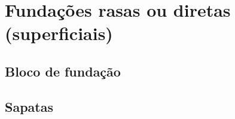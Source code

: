 \documentclass[12pt, a4paper]{article}
\begin{document}
	

	\section{Fundações rasas ou diretas (superficiais)}

		\subsection{Bloco de fundação}
		

		\subsection{Sapatas}
		
\end{document}
